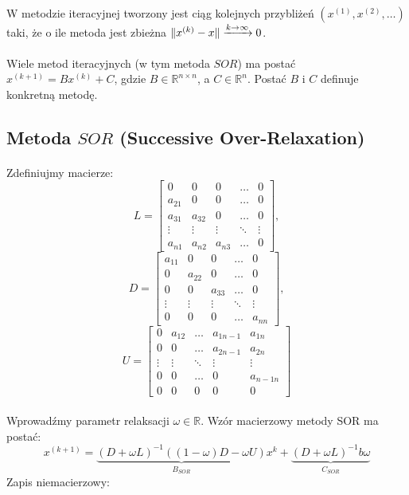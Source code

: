 \documentclass{article}
\DeclarePairedDelimiter{\norm}{\lVert}{\rVert}
\begin{document}
\paragraph{}
W metodzie iteracyjnej tworzony jest ciąg kolejnych przybliżeń 
\((x^{(1)}, x^{(2)},\dots)\)
taki, że o ile metoda jest zbieżna \(
\norm{x^{(k)}-x}\xrightarrow{k\rightarrow\infty}0
\).
\paragraph{}
Wiele metod iteracyjnych (w tym metoda $SOR$) ma postać \\ \(x^{(k+1)}=Bx^{(k)}+C\), gdzie \(B\in \mathbb{R}^{n\times n}\), a \(C\in\mathbb{R}^{n}\). Postać $B$ i $C$ definuje konkretną metodę.
\subsection {Metoda $SOR$ (Successive Over-Relaxation)}
\paragraph{}
Zdefiniujmy macierze:
\[
L = \begin{bmatrix}
  0 & 0 & 0 & \dots &0\\
  a_{21} &0 & 0 & \dots & 0\\
  a_{31} & a_{32} &0  & \dots & 0\\
 \vdots & \vdots &\vdots & \ddots & \vdots \\
  a_{n1} & a_{n2} &a_{n3} & \dots & 0
\end{bmatrix},\]
\[
D = \begin{bmatrix}
  a_{11} & 0 & 0 & \dots &0\\
  0 & a_{22} & 0 & \dots & 0\\
  0 & 0  & a_{33} & \dots & 0\\
 \vdots & \vdots &\vdots & \ddots & \vdots \\
  0 & 0 & 0 & \dots & a_{nn}
\end{bmatrix},\]
\[
U = \begin{bmatrix}
  0 & a_{12} & \dots & a_{1n-1} & a_{1n} \\
  0 & 0 & \dots &  a_{2n-1} & a_{2n}\\
 \vdots & \vdots &\ddots & \vdots & \vdots \\
  0 & 0  &\dots &  0 & a_{n-1n}\\
  0 & 0 & 0 & 0 & 0
\end{bmatrix}
 \]
\paragraph{}
Wprowadźmy parametr relaksacji $\omega \in \mathbb{R}$.
Wzór macierzowy metody SOR ma postać:
\[
x^{(k+1)}=\underbrace{(D+\omega L)^{-1}((1-\omega)D-\omega U)}_{B_{SOR}}x^k + \underbrace{(D+ \omega L)^{-1}b\omega}_{C_{SOR}}
\]
Zapis niemacierzowy:
\begin{algorithmic}
\end{algorithmic}
\end{document}
